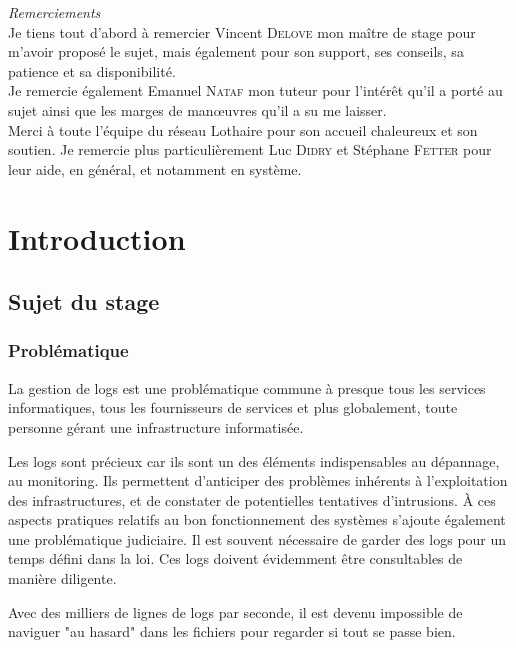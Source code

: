 \documentclass[a4paper,12pt,one side,titlepage]{report}
\begin{document}




\emph{\Large Remerciements}
\\[2cm]
Je tiens tout d'abord à remercier Vincent \textsc{Delove} mon maître de stage pour 
m'avoir proposé le sujet, mais également pour son support, ses conseils, sa patience
et sa disponibilité.
\\[2cm]
Je remercie également Emanuel \textsc{Nataf} mon tuteur pour l'intérêt qu'il a porté au 
sujet ainsi que les marges de manœuvres qu'il a su me laisser.
\\[1cm]
Merci à toute l'équipe du réseau Lothaire pour son accueil chaleureux et son soutien.
Je remercie plus particulièrement  Luc \textsc{Didry} et Stéphane \textsc{Fetter} pour leur
aide, en général, et  notamment en système.

\setcounter{tocdepth}{1}
\tableofcontents

\part{Introduction}

\chapter{Sujet du stage}
\section{Problématique}
La gestion de \gls{logs} est une problématique commune à presque tous les services informatiques,
tous les fournisseurs de services et plus globalement, toute personne gérant une infrastructure 
informatisée.

Les \gls{logs} sont précieux car ils sont un des éléments indispensables au dépannage, 
au monitoring. Ils permettent d'anticiper des problèmes inhérents à l'exploitation 
des infrastructures, et  de constater de potentielles tentatives d'intrusions.
À ces aspects pratiques relatifs au bon fonctionnement des systèmes s'ajoute également
une problématique judiciaire. Il est souvent nécessaire de garder des logs pour un 
temps défini  dans la loi. Ces logs doivent évidemment être consultables de manière
diligente.

Avec des milliers de lignes de logs par seconde, il est devenu impossible de naviguer
"au hasard" dans les fichiers pour regarder si tout se passe bien.
\end{document}
